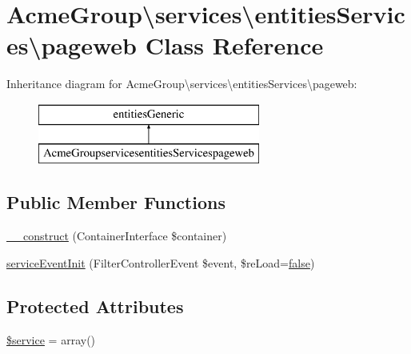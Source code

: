\hypertarget{class_acme_group_1_1services_1_1entities_services_1_1pageweb}{\section{Acme\+Group\textbackslash{}services\textbackslash{}entities\+Services\textbackslash{}pageweb Class Reference}
\label{class_acme_group_1_1services_1_1entities_services_1_1pageweb}
}
Inheritance diagram for Acme\+Group\textbackslash{}services\textbackslash{}entities\+Services\textbackslash{}pageweb\+:\begin{figure}[H]
\begin{center}
\leavevmode
\includegraphics[height=2.000000cm]{class_acme_group_1_1services_1_1entities_services_1_1pageweb}
\end{center}
\end{figure}
\subsection*{Public Member Functions}
\begin{DoxyCompactItemize}
\item 
\hyperlink{class_acme_group_1_1services_1_1entities_services_1_1pageweb_ac761ad4afafe0d1214c9b74595297ec9}{\+\_\+\+\_\+construct} (Container\+Interface \$container)
\item 
\hyperlink{class_acme_group_1_1services_1_1entities_services_1_1pageweb_ac9007f9a7ad947c36a17d5b9fb8ce690}{service\+Event\+Init} (Filter\+Controller\+Event \$event, \$re\+Load=\hyperlink{validate_8js_a5df37b7f02e5cdc7d9412b7f872b8e01}{false})
\end{DoxyCompactItemize}
\subsection*{Protected Attributes}
\begin{DoxyCompactItemize}
\item 
\hyperlink{class_acme_group_1_1services_1_1entities_services_1_1pageweb_a19ca31145b1e3ca674b98a7ba03d4f05}{\$service} = array()
\end{DoxyCompactItemize}



